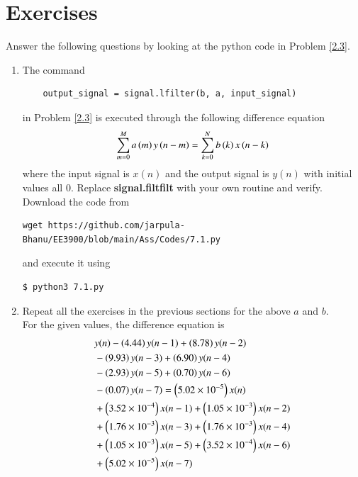 \documentclass[journal,12pt,twocolumn]{IEEEtran}
\renewcommand\thesection{\arabic{section}}
\begin{document}
\section{Exercises}
Answer the following questions by looking at the python code in Problem \ref{2.3}.
\begin{enumerate}[label=\thesection.\arabic*]
\item
The command
\begin{lstlisting}
	output_signal = signal.lfilter(b, a, input_signal)
	\end{lstlisting}
in Problem \ref{2.3} is executed through the following difference equation
\begin{equation}
\label{eq:iir_filter_gen}
 \sum _{m=0}^{M}a\left(m\right)y\left(n-m\right)=\sum _{k=0}^{N}b\left(k\right)x\left(n-k\right)
\end{equation}
%
where the input signal is $x(n)$ and the output signal is $y(n)$ with initial values all 0. Replace
\textbf{signal.filtfilt} with your own routine and verify.\\
\solution Download the code from
\begin{lstlisting}
wget https://github.com/jarpula-Bhanu/EE3900/blob/main/Ass/Codes/7.1.py
\end{lstlisting}
and execute it using
\begin{lstlisting}
$ python3 7.1.py
\end{lstlisting}
%
\item Repeat all the exercises in the previous sections for the above $a$ and $b$.\\
\solution For the given values, the difference equation is
\begin{align}
	&y(n) - \left(4.44\right)y(n - 1) + \left(8.78\right)y(n - 2) \nonumber \\
	&- \left(9.93\right)y(n - 3) + \left(6.90\right)y(n - 4) \nonumber \\
	&- \left(2.93\right)y(n - 5) \nonumber + \left(0.70\right)y(n - 6) \nonumber \\
	&- \left(0.07\right)y(n - 7) = \left(5.02 \times 10^{-5}\right)x(n) \nonumber \\
	&+ \left(3.52 \times 10^{-4}\right)x(n - 1) + \left(1.05 \times 10^{-3}\right)x(n - 2) \nonumber \\
	&+ \left(1.76 \times 10^{-3}\right)x(n - 3) + \left(1.76 \times 10^{-3}\right)x(n - 4) \nonumber \\
	&+ \left(1.05 \times 10^{-3}\right)x(n - 5) + \left(3.52 \times 10^{-4}\right)x(n - 6) \nonumber \\
	&+ \left(5.02 \times 10^{-5}\right)x(n - 7)
\end{align}

\end{enumerate}
\end{document}
